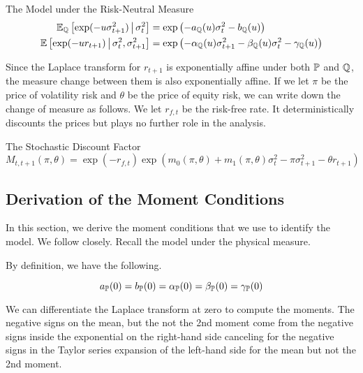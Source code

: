 \documentclass[11pt, letterpaper, twoside, final]{article}
\begin{document}
\begin{defn}{The Model under the Risk-Neutral Measure}
    \label{defn:risk_neutral_model}
    \begin{align}
        \operatorname{\mathbb{E}}_{\mathbb{Q}} \left[\exp(-u \sigma^2_{t+1}) \,\middle\vert\, \sigma^2_t\right] &= \exp\left( - a_{\mathbb{Q}}(u)
            \sigma^2_{t} - b_{\mathbb{Q}}(u) \right) \\
        \operatorname{\mathbb{E}}\left[\exp(-u r_{t+1}) \,\middle\vert\, \sigma^2_{t},  \sigma^2_{t+1}\right] &= \exp\left(- \alpha_{\mathbb{Q}}(u)
        \sigma^2_{t+1} - \beta_{\mathbb{Q}}(u)\sigma^2_{t} - \gamma_{\mathbb{Q}}(u) \right) 
    \end{align}
\end{defn}

Since the Laplace transform for $r_{t+1}$  is exponentially affine under both $\mathbb{P}$ and $\mathbb{Q}$, the measure change
between them is also exponentially affine.
If we let $\pi$ be the price of volatility risk and $\theta$ be the price of equity risk, we can write down the
change of measure as follows.
We let $r_{f,t}$ be the risk-free rate.
It deterministically discounts the prices but plays no further role in the analysis.


\begin{defn}{The Stochastic Discount Factor}
    \begin{equation}
        M_{t,t+1}(\pi, \theta) = \exp\left(-r_{f,t}\right) \exp\left(m_{0}(\pi, \theta) + m_1(\pi, \theta)
        \sigma_t^2 - \pi \sigma^2_{t+1} - \theta r_{t+1}\right) 
    \end{equation}
\end{defn}


\subsection{Derivation of the Moment Conditions}\label{sec:deriving_mom_conds}

In this section, we derive the moment conditions that we use to identify the model.
We follow \textcite{khrapov2016affine} closely.
Recall the model under the physical measure. 


\physicalMeasureModel*

By definition, we have the following. 

\begin{equation}
    a_{\mathbb{P}}(0) = b_{\mathbb{P}}(0) = \alpha_{\mathbb{P}}(0) = \beta_{\mathbb{P}}(0) = \gamma_{\mathbb{P}}(0) 
\end{equation}

We can differentiate the Laplace transform at zero to compute the moments.
The negative signs on the mean, but the not the 2nd moment come from the negative signs inside the exponential on
the right-hand side canceling for the negative signs in the Taylor series expansion of the left-hand side for the
mean but not the 2nd moment. 
\end{document}
